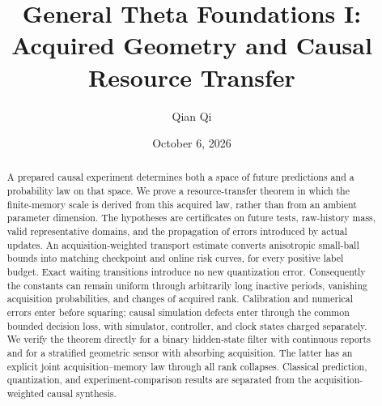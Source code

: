 \documentclass[11pt]{amsart}
\title[Acquired geometry and causal resource transfer]{General Theta Foundations I:\\Acquired Geometry and Causal Resource Transfer}
\author{Qian Qi}
\date{October 6, 2026}
\theoremstyle{definition}
\begin{document}
\begin{abstract}
A prepared causal experiment determines both a space of future predictions and a probability law on that space. We prove a resource-transfer theorem in which the finite-memory scale is derived from this acquired law, rather than from an ambient parameter dimension. The hypotheses are certificates on future tests, raw-history mass, valid representative domains, and the propagation of errors introduced by actual updates. An acquisition-weighted transport estimate converts anisotropic small-ball bounds into matching checkpoint and online risk curves, for every positive label budget. Exact waiting transitions introduce no new quantization error. Consequently the constants can remain uniform through arbitrarily long inactive periods, vanishing acquisition probabilities, and changes of acquired rank. Calibration and numerical errors enter before squaring; causal simulation defects enter through the common bounded decision loss, with simulator, controller, and clock states charged separately. We verify the theorem directly for a binary hidden-state filter with continuous reports and for a stratified geometric sensor with absorbing acquisition. The latter has an explicit joint acquisition--memory law through all rank collapses. Classical prediction, quantization, and experiment-comparison results are separated from the acquisition-weighted causal synthesis.
\end{abstract}
\maketitle






\clearpage

\end{document}
